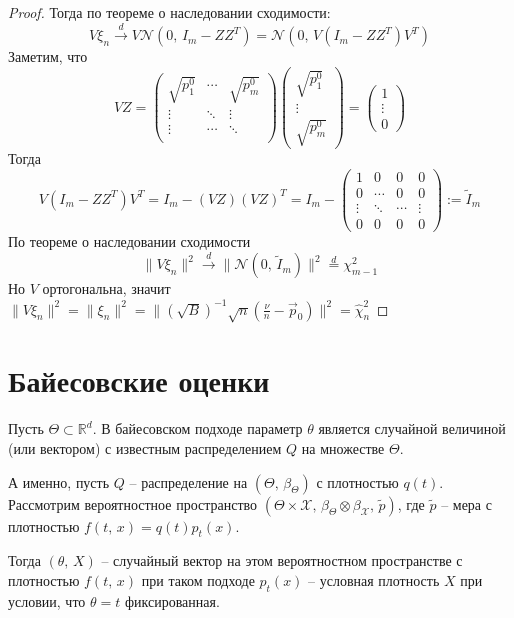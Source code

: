 \documentclass[a4paper,12pt]{article}
\theoremstyle{plain}
\theoremstyle{definition}
\theoremstyle{remark}
\begin{document}
\begin{proof}
  Тогда по теореме о наследовании сходимости:
  \[
    V\xi_n \overset{d}{\to} V\mathcal{N}(0,\, I_m - ZZ^T) = \mathcal{N}(0,\, V(I_m - ZZ^T)V^T)
  \]
  Заметим, что 
  \[
    VZ = \begin{pmatrix}
      \sqrt{p_1^0} & \cdots & \sqrt{p_m^0}\\
      \vdots & \ddots & \vdots\\
      \vdots & \cdots & \ddots\\
    \end{pmatrix}
    \begin{pmatrix}
      \sqrt{p_1^0}\\
      \vdots\\
      \sqrt{p_m^0}
    \end{pmatrix} = \begin{pmatrix}
      1\\
      \vdots\\
      0
    \end{pmatrix}
  \]
  Тогда
  \[
    V(I_m - ZZ^T)V^T = I_m - (VZ)(VZ)^T = I_m - \begin{pmatrix}
      1 & 0 & 0 & 0\\
      0 & \cdots & 0 & 0\\
      \vdots & \ddots & \cdots & \vdots\\
      0 & 0 & 0 & 0
    \end{pmatrix} := \tilde{I}_m
  \]
  По теореме о наследовании сходимости
  \[
    \|V\xi_n\|^2 \overset{d}{\to} \|\mathcal{N}(0,\, \tilde{I}_m)\|^2 \overset{d}{=} \chi^2_{m - 1}
  \]
  Но $V$ ортогональна, значит $\|V\xi_n\|^2 = \|\xi_n\|^2 = \|(\sqrt{B})^{-1}\sqrt{n}\left(\frac{\nu}{n} - \vec{p}_0\right)\|^2 = \hat{\chi}^2_n$
\end{proof}

\section{Байесовские оценки}
Пусть $\Theta \subset \mathbb{R}^d$. В байесовском подходе параметр $\theta$ является случайной величиной (или вектором) с известным распределением $Q$ на множестве $\Theta$.

А именно, пусть $Q$ -- распределение на $(\Theta,\, \beta_\Theta)$ с плотностью $q(t)$. Рассмотрим вероятностное пространство $(\Theta \times\mathcal{X},\, \beta_\Theta\otimes\beta_\mathcal{X},\, \tilde{p})$, где $\tilde{p}$ -- мера с плотностью $f(t,\,x) = q(t)p_t(x)$. 

Тогда $(\theta,\, X)$ -- случайный вектор на этом вероятностном пространстве с плотностью $f(t,\,x)$ при таком подходе $p_t(x)$ -- условная плотность $X$ при условии, что $\theta = t$ фиксированная.
\end{document}
